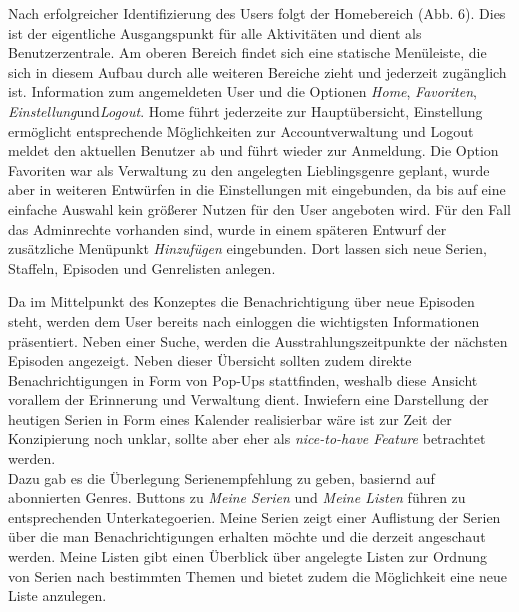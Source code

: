 \documentclass[a4paper]{article}
\begin{document}
Nach erfolgreicher Identifizierung des Users folgt der Homebereich (Abb. 6). Dies ist der eigentliche Ausgangspunkt für alle Aktivitäten und dient als Benutzerzentrale. Am oberen Bereich findet sich eine statische Menüleiste, die sich in diesem Aufbau durch alle weiteren Bereiche zieht und jederzeit zugänglich ist. Information zum angemeldeten User und die Optionen \textit{Home}, \textit{Favoriten}, \textit{Einstellung}und\textit {Logout}. Home führt jederzeite zur Hauptübersicht, Einstellung ermöglicht entsprechende Möglichkeiten zur Accountverwaltung und Logout meldet den aktuellen Benutzer ab und führt wieder zur Anmeldung. Die Option Favoriten war als Verwaltung zu den angelegten Lieblingsgenre geplant, wurde aber in weiteren Entwürfen in die Einstellungen mit eingebunden, da bis auf eine einfache Auswahl kein größerer Nutzen für den User angeboten wird. Für den Fall das Adminrechte vorhanden sind, wurde in einem späteren Entwurf der zusätzliche Menüpunkt \textit{Hinzufügen} eingebunden. Dort lassen sich neue Serien, Staffeln, Episoden und Genrelisten anlegen.\\





\newpage 

Da im Mittelpunkt des Konzeptes die Benachrichtigung über neue Episoden steht, werden dem User bereits nach einloggen die wichtigsten Informationen präsentiert. Neben einer Suche, werden die Ausstrahlungszeitpunkte der nächsten Episoden angezeigt. Neben dieser Übersicht sollten zudem direkte Benachrichtigungen in Form von Pop-Ups stattfinden, weshalb diese Ansicht vorallem der Erinnerung und Verwaltung dient. Inwiefern eine Darstellung der heutigen Serien in Form eines Kalender realisierbar wäre ist zur Zeit der Konzipierung noch unklar, sollte aber eher als \textit{nice-to-have Feature} betrachtet werden.\\
Dazu gab es die Überlegung Serienempfehlung zu geben, basiernd auf abonnierten Genres. Buttons zu \textit{Meine Serien} und \textit{Meine Listen} führen zu entsprechenden Unterkategoerien.
Meine Serien zeigt einer Auflistung der Serien über die man Benachrichtigungen erhalten möchte und die derzeit angeschaut werden. Meine Listen gibt einen Überblick über angelegte Listen zur Ordnung von Serien nach bestimmten Themen und bietet zudem die Möglichkeit eine neue Liste anzulegen. \\

\parskip 12pt
\parindent 0pt
\end{document}
